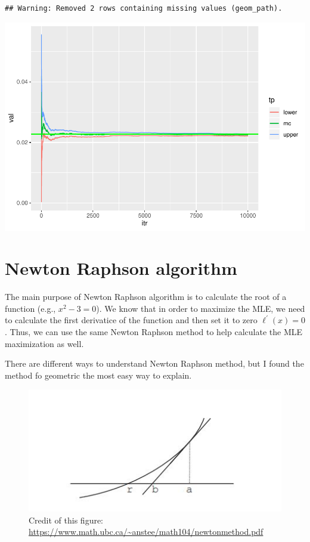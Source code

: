 \documentclass[]{book}
\begin{document}
\begin{verbatim}
## Warning: Removed 2 rows containing missing values (geom_path).
\end{verbatim}

\includegraphics{bookdown-demo_files/figure-latex/unnamed-chunk-22-1.pdf}

\hypertarget{newton-raphson-algorithm}{%
\section{Newton Raphson algorithm}\label{newton-raphson-algorithm}}

The main purpose of Newton Raphson algorithm is to calculate the root of a function (e.g., \(x^2-3=0\)). We know that in order to maximize the MLE, we need to calculate the first derivatice of the function and then set it to zero \(\ell^{'}(x)=0\). Thus, we can use the same Newton Raphson method to help calculate the MLE maximization as well.

There are different ways to understand Newton Raphson method, but I found the method fo geometric the most easy way to explain.

\begin{figure}
\centering
\includegraphics{Newton.jpg}
\caption{Credit of this figure: \url{https://www.math.ubc.ca/~anstee/math104/newtonmethod.pdf}}
\end{figure}
\end{document}
